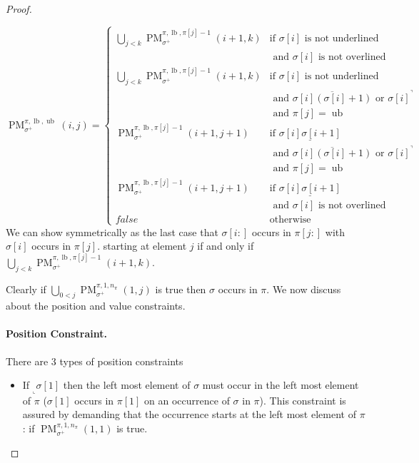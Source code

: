 \documentclass[a4paper]{llncs}
\newcommand{\ptext}{\pi}
\newcommand{\pmotif}{\sigma}
\newcommand{\pbmotif}{\pmotif^+}
\DeclareMathOperator{\PMa}{PM}
\newcommand{\PM}[6]{\PMa_{{#1}}^{{#2},{#3},{#4}}({#5},{#6})}
\DeclareMathOperator{\lb}{lb}
\DeclareMathOperator{\ub}{ub}
\begin{document}
\begin{proof}
\begin{itemize}
	$$
	\PM{\pbmotif}{\ptext}{\lb}{\ub}{i}{j}=
	\begin{cases}
			\bigcup_{j<k} \PM{\pbmotif}{\ptext}{\lb}{\ptext[j]-1}{i+1}{k}
				& \text{if $\pmotif[i]$ is not underlined } \\
				& \text{ and $\pmotif[i]$ is not overlined} \\
			\bigcup_{j<k} \PM{\pbmotif}{\ptext}{\lb}{\ptext[j]-1}{i+1}{k}
				& \text{if $\pmotif[i]$ is not underlined } \\
				& \text{ and $\overline{\pmotif[i](\pmotif[i]+1)}$ or ${\pmotif[i]}^\urcorner$}\\
				& \text{ and $\ptext[j]=\ub$} \\
			\PM{\pbmotif}{\ptext}{\lb}{\ptext[j]-1}{i+1}{j+1}
				& \text{if $\underline{\pmotif[i]\pmotif[i+1]}$ } \\
				& \text{ and $\overline{\pmotif[i](\pmotif[i]+1)}$ or ${\pmotif[i]}^\urcorner$}\\
				& \text{ and $\ptext[j]=\ub$} \\
			\PM{\pbmotif}{\ptext}{\lb}{\ptext[j]-1}{i+1}{j+1}
				& \text{if $\underline{\pmotif[i]\pmotif[i+1]}$ } \\
				& \text{ and $\pmotif[i]$ is not overlined} \\
			false & \text{otherwise}
	\end{cases}
	$$	
	We can show symmetrically as the last case that 
	$\pmotif[i:]$ occurs in $\ptext[j:]$
	with $\sigma[i]$ occurs in $\pi[j]$.
	 starting at element $j$ if and only if $\bigcup_{j<k} \PM{\pbmotif}{\ptext}{\lb}{\ptext[j]-1}{i+1}{k}$. 

\end{itemize}

Clearly if $\bigcup_{0<j} \PM{\pbmotif}{\ptext}{1}{n_\ptext}{1}{j}$ is true then $\sigma$ occurs in $\pi$. We now discuss about the position and value constraints.
\paragraph{Position Constraint.} There are 3 types of position constraints 
\begin{itemize}
	\item If $_\llcorner{\sigma[1]}$ then the left most element of $\sigma$  must occur in the left most element of $\pi$ ($\pmotif[1]$ occurs in $\ptext[1]$ on an occurrence of $\pmotif$ in $\ptext$). This constraint is assured by demanding that the occurrence starts at the left most element of $\ptext$ : if  $\PM{\pbmotif}{\ptext}{1}{n_\ptext}{1}{1}$ is true.
	

\end{itemize}
\end{proof}
\end{document}
